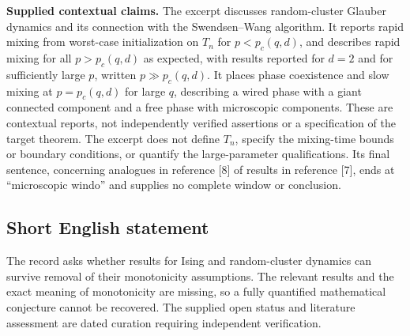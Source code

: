\documentclass[11pt]{article}
\begin{document}
\textbf{Supplied contextual claims.} The excerpt discusses random-cluster Glauber dynamics and its connection with the Swendsen--Wang algorithm. It reports rapid mixing from worst-case initialization on \(T_n\) for \(p<p_c(q,d)\), and describes rapid mixing for all \(p>p_c(q,d)\) as expected, with results reported for \(d=2\) and for sufficiently large \(p\), written \(p\gg p_c(q,d)\). It places phase coexistence and slow mixing at \(p=p_c(q,d)\) for large \(q\), describing a wired phase with a giant connected component and a free phase with microscopic components. These are contextual reports, not independently verified assertions or a specification of the target theorem. The excerpt does not define \(T_n\), specify the mixing-time bounds or boundary conditions, or quantify the large-parameter qualifications. Its final sentence, concerning analogues in reference [8] of results in reference [7], ends at ``microscopic windo'' and supplies no complete window or conclusion.
\subsection{Short English statement}
The record asks whether results for Ising and random-cluster dynamics can survive removal of their monotonicity assumptions. The relevant results and the exact meaning of monotonicity are missing, so a fully quantified mathematical conjecture cannot be recovered. The supplied open status and literature assessment are dated curation requiring independent verification.
\end{document}
